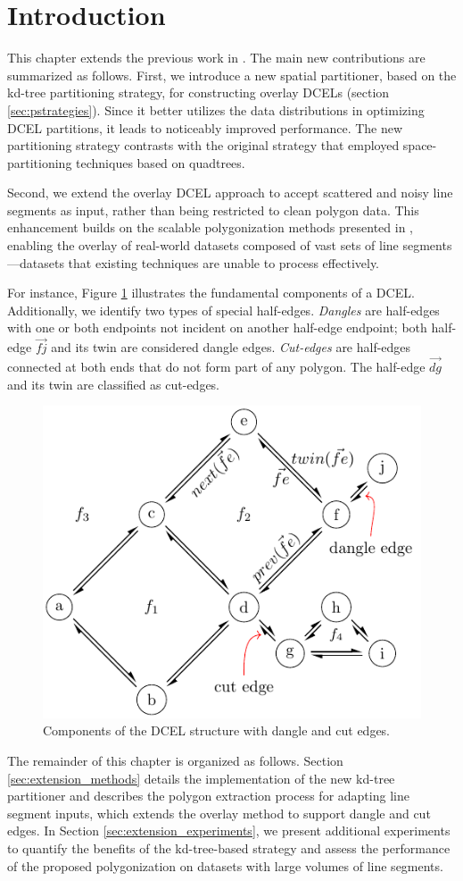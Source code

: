 \section{Introduction} %

This chapter extends the previous work in \cite{calderon_scalable_2023}. The main new contributions are summarized as follows. First, we introduce a new spatial partitioner, based on the kd-tree partitioning strategy, for constructing overlay  DCELs (section \ref{sec:pstrategies}). Since it better utilizes the data distributions in optimizing DCEL partitions, it leads to noticeably improved performance. The new partitioning strategy contrasts with the original strategy that employed space-partitioning techniques based on quadtrees. 

Second, we extend the overlay DCEL approach to accept scattered and noisy line segments as input, rather than being restricted to clean polygon data. This enhancement builds on the scalable polygonization methods presented in \cite{abdelhafeez_ddcel_2023}, enabling the overlay of real-world datasets composed of vast sets of line segments —datasets that existing techniques are unable to process effectively.

For instance, Figure \ref{fig:extension_dcel_example} illustrates the fundamental components of a DCEL. Additionally, we identify two types of special half-edges. \textit{Dangles} are half-edges with one or both endpoints not incident on another half-edge endpoint; both half-edge $\overrightarrow{fj}$ and its twin are considered dangle edges. \textit{Cut-edges} are half-edges connected at both ends that do not form part of any polygon. The half-edge $\overrightarrow{dg}$ and its twin are classified as cut-edges.

\begin{figure}
    \centering
    \includegraphics[width=0.6\linewidth]{chapterExtension/dcel_example2}
    \caption{Components of the DCEL structure with dangle and cut edges.}\label{fig:extension_dcel_example}
\end{figure}

The remainder of this chapter is organized as follows. Section \ref{sec:extension_methods} details the implementation of the new kd-tree partitioner and describes the polygon extraction process for adapting line segment inputs, which extends the overlay method to support dangle and cut edges. In Section \ref{sec:extension_experiments}, we present additional experiments to quantify the benefits of the kd-tree-based strategy and assess the performance of the proposed polygonization on datasets with large volumes of line segments.
